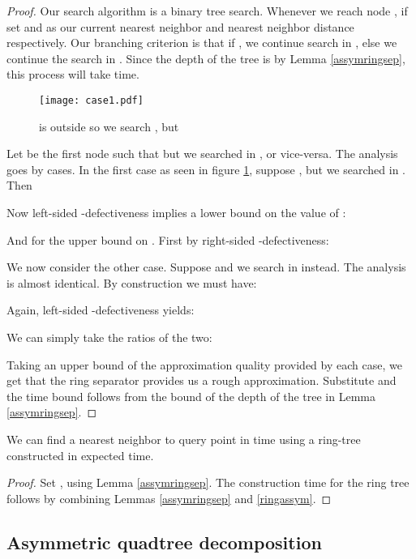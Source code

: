 \documentclass[11pt]{myclass}
\begin{document}
\begin{proof}
Our search algorithm is a binary tree search. Whenever we reach node , if  
set  and  as our current 
nearest neighbor and nearest neighbor distance respectively.  
Our branching criterion is that if  , we
 continue search in , else we continue the  
search in . Since the depth of the tree is  by Lemma \ref{assymringsep}, 
this process will take  time.
\begin{figure}[H]
  \begin{center}
    \texttt{[image: case1.pdf]}
  \end{center}
  \caption{ is outside  so we search , but }
  \label{case1}
\end{figure}
 Let  be the first node such that  but we searched in , or vice-versa. 
The analysis goes by cases. In the first case as seen in figure \ref{case1}, suppose , but we searched in .
Then


Now left-sided -defectiveness implies a lower bound on the value of :


And for the upper bound on . First by right-sided -defectiveness:


We now consider the other case. Suppose  and we search in  instead. The analysis is almost identical. By construction we must have:


Again, left-sided -defectiveness yields:


We can simply take the ratios of the two:


Taking an upper bound of the approximation quality provided by each case, we get that the ring separator provides us a  rough approximation.
Substitute   and the time bound follows from the bound of the depth of the tree in Lemma \ref{assymringsep}.
\end{proof}

\begin{corollary}
 We can find a  nearest neighbor to query point  in  time  using a  ring-tree constructed in
  expected time.
\end{corollary}

\begin{proof}
 Set , using Lemma \ref{assymringsep}. The construction time for the ring tree follows by combining Lemmas \ref{assymringsep}
and \ref{ringassym}.
\end{proof}



\subsection{Asymmetric quadtree decomposition}
\label{subsec:quadextension}
\end{document}
